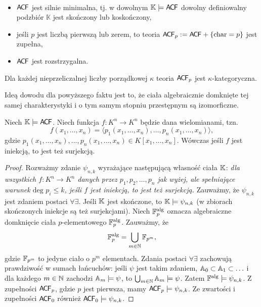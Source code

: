 \documentclass{article}
\begin{document}
\begin{wnn}
	~\begin{itemize}
		\item $\mathsf{A \mkern-2.0mu C \mkern-1.1mu F}$ jest silnie minimalna, tj. w dowolnym $\mathbb{K} \models \mathsf{A \mkern-2.0mu C \mkern-1.1mu F}$ dowolny definiowalny podzbiór $\mathbb{K}$ jest skończony lub koskończony,
		\item jeśli $p$ jest liczbą pierwszą lub zerem, to teoria $\mathsf{A \mkern-2.0mu C \mkern-1.1mu F}_p := \mathsf{A \mkern-2.0mu C \mkern-1.1mu F} +  \{\text{char} = p\}$ jest zupełna,
		\item $\mathsf{A \mkern-2.0mu C \mkern-1.1mu F}$ jest rozstrzygalna.
	\end{itemize}
\end{wnn}

\begin{fakt}
	Dla każdej nieprzeliczalnej liczby porządkowej $\kappa$ teoria $\mathsf{A \mkern-2.0mu C \mkern-1.1mu F}_p$ jest $\kappa$-kategoryczna.
\end{fakt}
Ideą dowodu dla powyższego faktu jest to, że ciała algebraicznie domknięte tej samej charakterystyki i o tym samym stopniu przestępnym są izomorficzne.

\begin{tw}[Ax--Grothendick]
	Niech $\mathbb{K} \models \mathsf{A \mkern-2.0mu C \mkern-1.1mu F}$.
	Niech funkcja $f \colon K^n \rightarrow K^n$ będzie dana wielomianami, tzn. $$f(x_1, \ldots, x_n) = \langle p_1(x_1, \ldots, x_n), \ldots, p_n(x_1, \ldots, x_n)\rangle ,$$ gdzie $p_1(x_1, \ldots, x_n), \ldots, p_n(x_1, \ldots, x_n) \in K[x_1, \ldots, x_n]$. %
	Wówczas jeśli $f$ jest iniekcją, to jest też surjekcją.
\end{tw}
\begin{proof}
	Rozważmy zdanie $\psi_{n,k}$ wyrażające następującą własność ciała $\mathbb{K}$:
	\textit{dla wszystkich $f \colon K^n \rightarrow K^n$ danych przez $p_1, p_2, \ldots, p_n$ jak wyżej, ale spełniające warunek $\text{deg } p_i \leq k$, jeśli $f$ jest iniekcją, to jest też surjekcją. }
	Zauważmy, że $\psi_{n,k}$ jest zdaniem postaci $\forall \exists$.
	Jeśli $\mathbb{K}$ jest skończone, to $\mathbb{K} \models \psi_{n,k}$ (w zbiorach skończonych iniekcje są też surjekcjami). %
	Niech $\mathbb{F}^{\text{alg}}_{p}$ oznacza algebraiczne domknięcie ciała $p$-elementowego $\mathbb{F}^{\text{alg}}_p$.
	Zauważmy, że $$\mathbb{F}^{\text{alg}}_{p} = \bigcup_{m \in \mathbb{N}} \mathbb{F}_{p^m},$$ gdzie $\mathbb{F}_{p^m}$ to jedyne ciało o $p^m$ elementach.
	Zdania postaci $\forall \exists$ zachowują prawdziwość w sumach łańcuchów:
	jeśli $\psi$ jest takim zdaniem, $\mathbb{A}_0 \subset \mathbb{A}_1 \subset \ldots $ i dla każdego $m \in \mathbb{N}$ zachodzi $\mathbb{A}_m \models \psi$, to $\bigcup_{m \in \mathbb{N}} \mathbb{A}_m \models \psi$.
	Zatem $\mathbb{F}^{\text{alg}} \models \psi_{n,k}$. %
	Z zupełności $\mathsf{A \mkern-2.0mu C \mkern-1.1mu F}_p$, gdzie $p$ jest pierwsza, mamy $\mathsf{A \mkern-2.0mu C \mkern-1.1mu F}_p \models \psi_{n,k}$.
	Ze zwartości i zupełności $\mathsf{A \mkern-2.0mu C \mkern-1.1mu F}_0$ również $\mathsf{A \mkern-2.0mu C \mkern-1.1mu F}_0 \models \psi_{n,k}$.

\end{proof}
\end{document}
